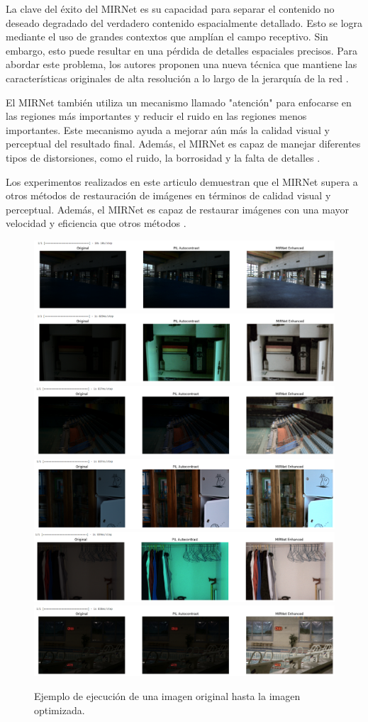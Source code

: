 \documentclass[a4paper,
               ]{jacow}
\begin{document}
La clave del éxito del MIRNet es su capacidad para separar el contenido no deseado degradado del verdadero contenido espacialmente detallado. Esto se logra mediante el uso de grandes contextos que amplían el campo receptivo. Sin embargo, esto puede resultar en una pérdida de detalles espaciales precisos. Para abordar este problema, los autores proponen una nueva técnica que mantiene las características originales de alta resolución a lo largo de la jerarquía de la red \cite{tian2020learning}.


El MIRNet también utiliza un mecanismo llamado "atención" para enfocarse en las regiones más importantes y reducir el ruido en las regiones menos importantes. Este mecanismo ayuda a mejorar aún más la calidad visual y perceptual del resultado final. Además, el MIRNet es capaz de manejar diferentes tipos de distorsiones, como el ruido, la borrosidad y la falta de detalles \cite{tian2020learning}.

Los experimentos realizados en este articulo demuestran que el MIRNet supera a otros métodos de restauración de imágenes en términos de calidad visual y perceptual. Además, el MIRNet es capaz de restaurar imágenes con una mayor velocidad y eficiencia que otros métodos \cite{tian2020learning}.

\begin{figure}[!h]
    \centering
    \includegraphics*[width=.5\textwidth]{ll-1}
    \includegraphics*[width=.5\textwidth]{ll-2}
    \includegraphics*[width=.5\textwidth]{ll-3}
    \includegraphics*[width=.5\textwidth]{ll-4}
    \includegraphics*[width=.5\textwidth]{ll-5}
    \includegraphics*[width=.5\textwidth]{ll-6}
    \caption{Ejemplo de ejecución de una imagen original hasta la imagen optimizada.}
    \label{fig:ejem_procesamiento}
\end{figure}
\end{document}
